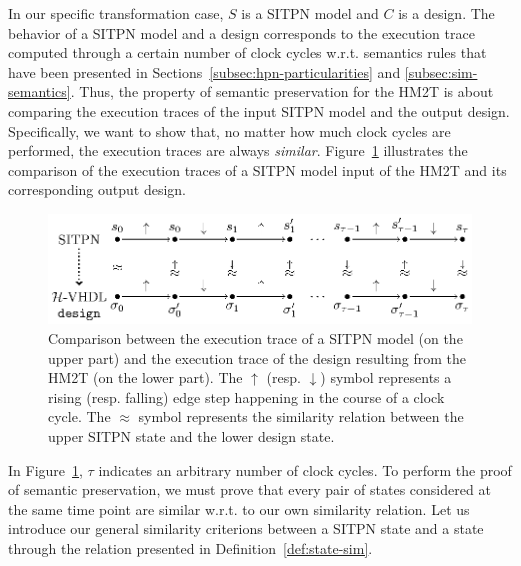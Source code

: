 \documentclass[pdflatex,sn-mathphys]{sn-jnl}%
\theoremstyle{thmstyleone}%
\theoremstyle{thmstyletwo}%
\theoremstyle{thmstylethree}%
\begin{document}
In our specific transformation case, $S$ is a SITPN model and $C$ is a
\hvhdl{} design. The behavior of a SITPN model and a \hvhdl{} design
corresponds to the execution trace computed through a certain number
of clock cycles w.r.t. semantics rules that have been presented in
Sections~\ref{subsec:hpn-particularities} and
\ref{subsec:sim-semantics}. Thus, the property of semantic
preservation for the HM2T is about comparing the execution traces of
the input SITPN model and the output \hvhdl{} design. Specifically, we
want to show that, no matter how much clock cycles are performed, the
execution traces are always
\textit{similar}. Figure~\ref{fig:trace-comparison} illustrates the
comparison of the execution traces of a SITPN model input of the HM2T
and its corresponding output design.
\begin{figure}[!ht]
  \centering
  \includegraphics[keepaspectratio,width=\textwidth]{trace-comparison-full.eps}
  \caption{Comparison between the execution trace of a SITPN model (on
    the upper part) and the execution trace of the \hvhdl{} design
    resulting from the HM2T (on the lower part). The $\uparrow$
    (resp. $\downarrow$) symbol represents a rising (resp. falling)
    edge step happening in the course of a clock cycle. The $\approx$
    symbol represents the similarity relation between the upper SITPN
    state and the lower \hvhdl{} design state.}
  \label{fig:trace-comparison}
\end{figure}

In Figure~\ref{fig:trace-comparison}, $\tau$ indicates an arbitrary
number of clock cycles. To perform the proof of semantic preservation,
we must prove that every pair of states considered at the same time
point are similar w.r.t. to our own similarity relation.  Let us
introduce our general similarity criterions between a SITPN state and
a \hvhdl{} state through the relation presented in
Definition~\ref{def:state-sim}.
\end{document}
